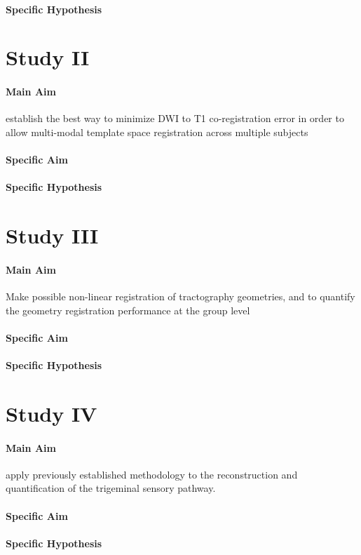 \paragraph{Specific Hypothesis}

\section{Study II}

\paragraph{Main Aim}
establish the best way to minimize DWI to T1 co-registration error in order to allow multi-modal template space registration across multiple subjects
\paragraph{Specific Aim}
\paragraph{Specific Hypothesis}

\section{Study III}

\paragraph{Main Aim}
Make possible non-linear registration of tractography geometries, and to quantify the geometry registration performance at the group level
\paragraph{Specific Aim}
\paragraph{Specific Hypothesis}

\section{Study IV}
\paragraph{Main Aim}
apply previously established methodology to the reconstruction and quantification of the trigeminal sensory pathway. 

\paragraph{Specific Aim}
\paragraph{Specific Hypothesis}
